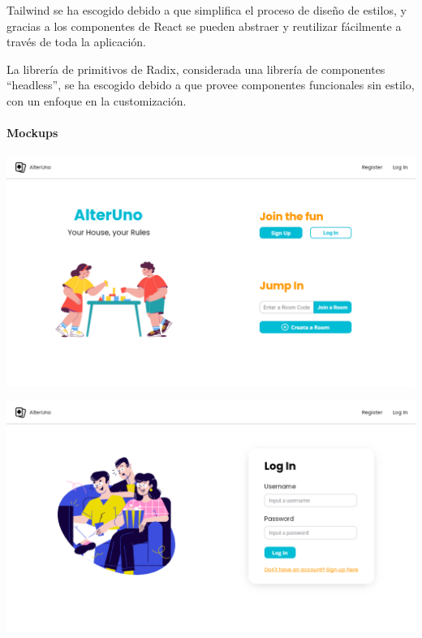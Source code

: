 Tailwind se ha escogido debido a que simplifica el proceso de diseño de estilos, y gracias a los componentes de React se pueden abstraer y reutilizar fácilmente a través de toda la aplicación. 

La librería de primitivos de Radix, considerada una librería de componentes “headless”, se ha escogido debido a que provee componentes funcionales sin estilo, con un enfoque en la customización. 

\paragraph{Mockups}

\begin{center}
  \includegraphics[width=1\textwidth]{img/Mockup Main Page}
   \label{fig:mainmockup}
\end{center}

\begin{center}
  \includegraphics[width=1\textwidth]{img/Mockup Log In}
   \label{fig:loginmockup}
\end{center}

